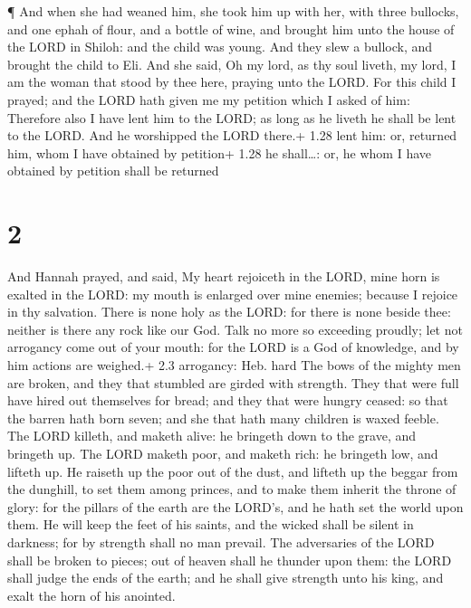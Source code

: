  ¶ And when she had weaned him, she took him up with her,
with three bullocks, and one ephah of flour, and a bottle of wine, and
brought him unto the house of the LORD in Shiloh: and the child was
young.  And they slew a bullock, and brought the child to
Eli.  And she said, Oh my lord, as thy soul liveth, my
lord, I am the woman that stood by thee here, praying unto the LORD.
 For this child I prayed; and the LORD hath given me my
petition which I asked of him:  Therefore also I have lent
him to the LORD; as long as he liveth he shall be lent to the LORD. And
he worshipped the LORD there.+ 1.28 lent him: or, returned him, whom I
have obtained by petition+ 1.28 he shall\ldots: or, he whom I have
obtained by petition shall be returned

\hypertarget{section-1}{%
\section{2}\label{section-1}}

 And Hannah prayed, and said, My heart rejoiceth in the
LORD, mine horn is exalted in the LORD: my mouth is enlarged over mine
enemies; because I rejoice in thy salvation.  There is none
holy as the LORD: for there is none beside thee: neither is there any
rock like our God.  Talk no more so exceeding proudly; let
not arrogancy come out of your mouth: for the LORD is a God of
knowledge, and by him actions are weighed.+ 2.3 arrogancy: Heb. hard
 The bows of the mighty men are broken, and they that
stumbled are girded with strength.  They that were full have
hired out themselves for bread; and they that were hungry ceased: so
that the barren hath born seven; and she that hath many children is
waxed feeble.  The LORD killeth, and maketh alive: he
bringeth down to the grave, and bringeth up.  The LORD
maketh poor, and maketh rich: he bringeth low, and lifteth up.
 He raiseth up the poor out of the dust, and lifteth up the
beggar from the dunghill, to set them among princes, and to make them
inherit the throne of glory: for the pillars of the earth are the
LORD's, and he hath set the world upon them.  He will keep
the feet of his saints, and the wicked shall be silent in darkness; for
by strength shall no man prevail.  The adversaries of the
LORD shall be broken to pieces; out of heaven shall he thunder upon
them: the LORD shall judge the ends of the earth; and he shall give
strength unto his king, and exalt the horn of his anointed.

